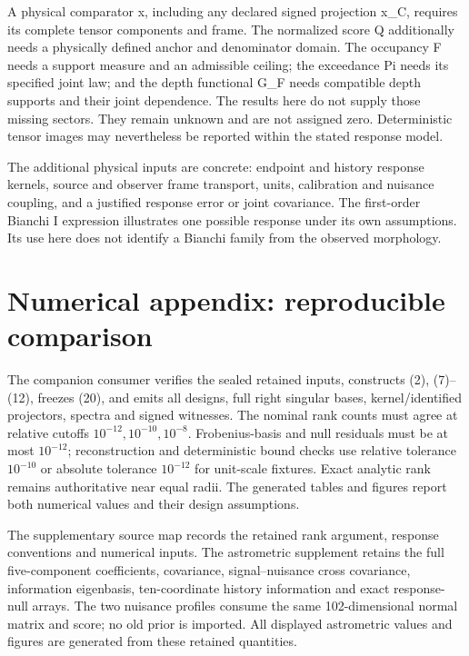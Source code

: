 A physical comparator x, including any declared signed projection x\_C, requires its complete tensor components and frame. The normalized score Q additionally needs a physically defined anchor and denominator domain. The occupancy F needs a support measure and an admissible ceiling; the exceedance Pi needs its specified joint law; and the depth functional G\_F needs compatible depth supports and their joint dependence. The results here do not supply those missing sectors. They remain unknown and are not assigned zero. Deterministic tensor images may nevertheless be reported within the stated response model.

The additional physical inputs are concrete: endpoint and history response kernels, source and observer frame transport, units, calibration and nuisance coupling, and a justified response error or joint covariance. The first-order Bianchi I expression illustrates one possible response under its own assumptions. Its use here does not identify a Bianchi family from the observed morphology.

\hypertarget{numerical-appendix-reproducible-comparison}{%
\appendix
\section{Numerical appendix: reproducible comparison}\label{numerical-appendix-reproducible-comparison}}

The companion consumer verifies the sealed retained inputs, constructs (2), (7)--(12), freezes (20), and emits all designs, full right singular bases, kernel/identified projectors, spectra and signed witnesses. The nominal rank counts must agree at relative cutoffs \(10^{-12},10^{-10},10^{-8}\). Frobenius-basis and null residuals must be at most \(10^{-12}\); reconstruction and deterministic bound checks use relative tolerance \(10^{-10}\) or absolute tolerance \(10^{-12}\) for unit-scale fixtures. Exact analytic rank remains authoritative near equal radii. The generated tables and figures report both numerical values and their design assumptions.

The supplementary source map records the retained rank argument, response conventions and numerical inputs. The astrometric supplement retains the full five-component coefficients, covariance, signal--nuisance cross covariance, information eigenbasis, ten-coordinate history information and exact response-null arrays. The two nuisance profiles consume the same 102-dimensional normal matrix and score; no old prior is imported. All displayed astrometric values and figures are generated from these retained quantities.

